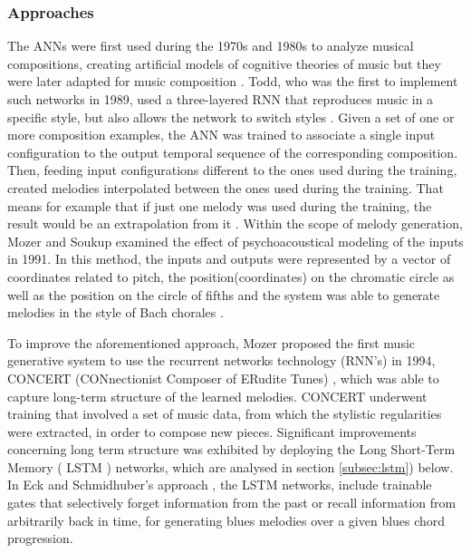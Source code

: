         \subsubsection{Approaches}
        The ANNs were first used during the 1970s and 1980s to analyze musical compositions, creating artificial models of cognitive theories of music \cite{todd1991music} but they were later adapted for music composition \cite{aiMethods}. Todd, who was the first to implement such networks in 1989, used a three-layered RNN that reproduces music in a specific style, but also allows the network to switch styles \cite{todd1989connectionist}. Given a set of one or more composition examples, the ANN was trained to associate a single input configuration to the output temporal sequence of the corresponding composition. Then, feeding input configurations different to the ones used during the training, created melodies interpolated between the ones used during the training. That means for example that if just one melody was used during the training, the result would be an extrapolation from it \cite{aiMethods}. Within the scope of melody generation, Mozer and Soukup examined the effect of psychoacoustical modeling of the inputs \cite{mozer1991connectionist} in 1991. In this method, the inputs and outputs were represented by a vector of coordinates related to pitch, the position(coordinates) on the chromatic circle as well as the position on the circle of fifths and the system was able to generate melodies in the style of Bach chorales \cite{maxim_kal_pap_book}. 

        To improve the aforementioned approach, Mozer proposed the first music generative system to use the recurrent networks technology (RNN's) in 1994, CONCERT (CONnectionist Composer of ERudite Tunes) \cite{mozer1994neural}, which was able to capture long-term structure of the learned melodies. CONCERT underwent training that involved a set of music data, from which the stylistic regularities were extracted, in order to compose new pieces. Significant improvements concerning long term structure was exhibited by deploying the Long Short-Term Memory ( LSTM ) networks, which are analysed in section \ref{subsec:lstm}) below. In Eck and Schmidhuber's approach \cite{eck2002learning}, the LSTM networks, include trainable gates that selectively forget information from the past or recall information from arbitrarily back in time, for generating blues melodies over a given blues chord progression. 

